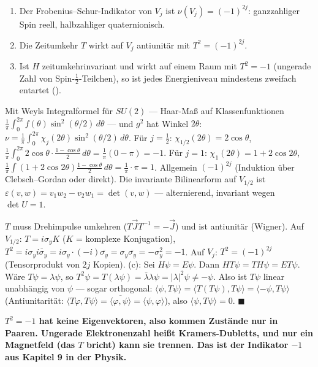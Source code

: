\begin{merksatz}
\begin{enumerate}[label=(\alph*), leftmargin=1.6em]
\item Der Frobenius--Schur-Indikator von $V_j$ ist $\nu(V_j) = (-1)^{2j}$: ganzzahliger Spin reell, halbzahliger quaternionisch.
\item Die Zeitumkehr $T$ wirkt auf $V_j$ antiunitär mit $T^{2} = (-1)^{2j}$.
\item Ist $H$ zeitumkehrinvariant und wirkt auf einem Raum mit $T^{2} = -1$ (ungerade Zahl von Spin-$\frac12$-Teilchen), so ist jedes Energieniveau mindestens zweifach entartet ().
\end{enumerate}

Mit Weyls Integralformel für $SU(2)$ --- Haar-Maß auf Klassenfunktionen $\frac1\pi\int_0^{2\pi}f(\theta)\sin^{2}(\theta/2)\,d\theta$ --- und $g^{2}$ hat Winkel $2\theta$: $\nu = \frac1\pi\int_0^{2\pi}\chi_j(2\theta)\sin^{2}(\theta/2)\,d\theta$. Für $j = \frac12$: $\chi_{1/2}(2\theta) = 2\cos\theta$, $\frac1\pi\int_0^{2\pi}2\cos\theta\cdot\frac{1 - \cos\theta}2\,d\theta = \frac1\pi(0 - \pi) = -1$. Für $j = 1$: $\chi_1(2\theta) = 1 + 2\cos2\theta$, $\frac1\pi\int(1 + 2\cos2\theta)\frac{1 - \cos\theta}2\,d\theta = \frac1\pi\cdot\pi = 1$. Allgemein $(-1)^{2j}$ (Induktion über Clebsch--Gordan oder direkt). Die invariante Bilinearform auf $V_{1/2}$ ist $\varepsilon(v, w) = v_1w_2 - v_2w_1 = \det(v, w)$ --- alternierend, invariant wegen $\det U = 1$.

$T$ muss Drehimpulse umkehren ($T\vec JT^{-1} = -\vec J$) und ist antiunitär (Wigner). Auf $V_{1/2}$: $T = i\sigma_yK$ ($K$ = komplexe Konjugation), $T^{2} = i\sigma_y\overline{i\sigma_y} = i\sigma_y\cdot(-i)\overline{\sigma_y} = \sigma_y\overline{\sigma_y} = -\sigma_y^{2} = -1$. Auf $V_j$: $T^{2} = (-1)^{2j}$ (Tensorprodukt von $2j$ Kopien). (c): Sei $H\psi = E\psi$. Dann $HT\psi = TH\psi = ET\psi$. Wäre $T\psi = \lambda\psi$, so $T^{2}\psi = T(\lambda\psi) = \bar\lambda\lambda\psi = |\lambda|^{2}\psi\neq-\psi$. Also ist $T\psi$ linear unabhängig von $\psi$ --- sogar orthogonal: $\langle\psi, T\psi\rangle = \langle T(T\psi), T\psi\rangle = \langle-\psi, T\psi\rangle$ (Antiunitarität: $\langle T\varphi, T\psi\rangle = \overline{\langle\varphi, \psi\rangle} = \langle\psi, \varphi\rangle$), also $\langle\psi, T\psi\rangle = 0$. $\blacksquare$

\begin{center}
\begin{minipage}{0.9\textwidth}
\textbf{$T^{2} = -1$ hat keine Eigenvektoren, also kommen Zustände nur in Paaren. Ungerade Elektronenzahl heißt Kramers-Dubletts, und nur ein Magnetfeld (das $T$ bricht) kann sie trennen. Das ist der Indikator $-1$ aus Kapitel 9 in der Physik.}
\end{minipage}
\end{center}


\end{merksatz}
